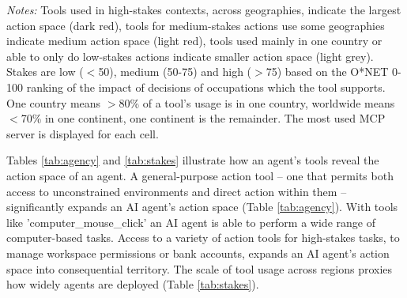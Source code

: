 \documentclass[manuscript,screen,nonacm,oneside]{acmart}
\begin{document}
\begin{table}[htbp]
\centering
\caption{AI agent action tool examples by geography and consequentiality.}
\small
{}
\begin{minipage}{\linewidth}
\scriptsize
\textit{Notes: }{Tools used in high-stakes contexts, across geographies, indicate the largest action space (dark red), tools for medium-stakes actions use some geographies indicate medium action space (light red), tools used mainly in one country or able to only do low-stakes actions indicate smaller action space (light grey). Stakes are low ($<$50), medium (50-75) and high ($>$75) based on the O*NET 0-100 ranking of the impact of decisions of occupations which the tool supports. One country means $>$80\% of a tool's usage is in one country, worldwide means $<$70\% in one continent, one continent is the remainder. The most used MCP server is displayed for each cell.}
\end{minipage}
\label{tab:stakes}
\end{table}

Tables \ref{tab:agency} and \ref{tab:stakes} illustrate how an agent's tools reveal the action space of an agent. A general-purpose action tool -- one that permits both access to unconstrained environments and direct action within them -- significantly expands an AI agent's action space (Table \ref{tab:agency}). With tools like 'computer\_mouse\_click' an AI agent is able to perform a wide range of computer-based tasks. Access to a variety of action tools for high-stakes tasks, to manage workspace permissions or bank accounts, expands an AI agent's action space into consequential territory. The scale of tool usage across regions proxies how widely agents are deployed (Table \ref{tab:stakes}).
\end{document}
